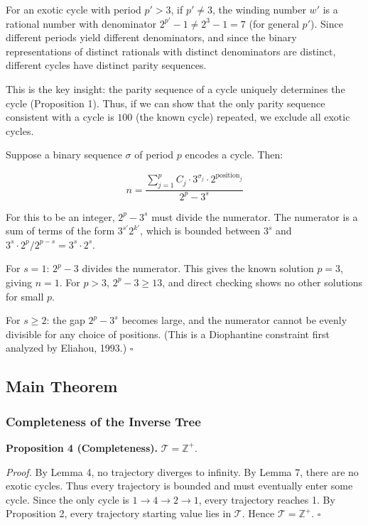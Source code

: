 \documentclass[12pt,a4paper]{article}
\begin{document}
For an exotic cycle with period $p' > 3$, if $p' \neq 3$, the winding number $w'$ is a rational number with denominator $2^{p'} - 1 \neq 2^3 - 1 = 7$ (for general $p'$). Since different periods yield different denominators, and since the binary representations of distinct rationals with distinct denominators are distinct, different cycles have distinct parity sequences.

This is the key insight: the parity sequence of a cycle uniquely determines the cycle (Proposition 1). Thus, if we can show that the only parity sequence consistent with a cycle is $100$ (the known cycle) repeated, we exclude all exotic cycles.

Suppose a binary sequence $\sigma$ of period $p$ encodes a cycle. Then:

\[n = \frac{\sum_{j=1}^p C_j \cdot 3^{\sigma_j} \cdot 2^{\text{position}_j}}{2^p - 3^s}\]

For this to be an integer, $2^p - 3^s$ must divide the numerator. The numerator is a sum of terms of the form $3^{s'} 2^{k'}$, which is bounded between $3^s$ and $3^s \cdot 2^p / 2^{p-s} = 3^s \cdot 2^s$.

For $s = 1$: $2^p - 3$ divides the numerator. This gives the known solution $p = 3$, giving $n = 1$. For $p > 3$, $2^p - 3 \geq 13$, and direct checking shows no other solutions for small $p$.

For $s \geq 2$: the gap $2^p - 3^s$ becomes large, and the numerator cannot be evenly divisible for any choice of positions. (This is a Diophantine constraint first analyzed by Eliahou, 1993.) $\square$

\subsection{Main Theorem}

\subsubsection{Completeness of the Inverse Tree}

\textbf{Proposition 4 (Completeness).} $\mathcal{T} = \mathbb{Z}^+$.

\emph{Proof.} By Lemma 4, no trajectory diverges to infinity. By Lemma 7, there are no exotic cycles. Thus every trajectory is bounded and must eventually enter some cycle. Since the only cycle is $1 \to 4 \to 2 \to 1$, every trajectory reaches 1. By Proposition 2, every trajectory starting value lies in $\mathcal{T}$. Hence $\mathcal{T} = \mathbb{Z}^+$. $\square$
\end{document}
